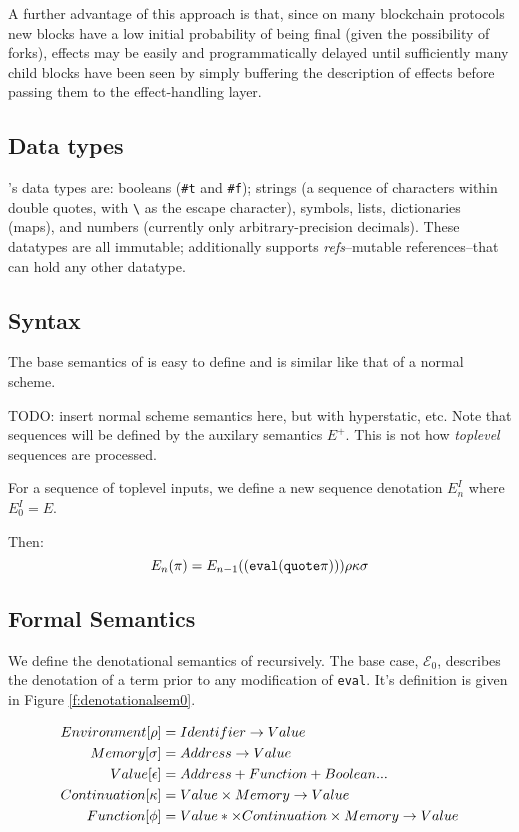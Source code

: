 A further advantage of this approach is that, since on many blockchain
protocols new blocks have a low initial probability of being final (given the
possibility of forks), effects may be easily and programmatically delayed until
sufficiently many child blocks have been seen by simply buffering the
description of effects before passing them to the effect-handling layer.

\subsection{Data types} \rad's data types are: booleans (\texttt{\#t} and
\texttt{\#f}); strings (a sequence of characters within double quotes, with
\texttt{\textbackslash} as the escape character), symbols, lists, dictionaries
(maps), and numbers (currently only arbitrary-precision decimals). These
datatypes are all immutable; additionally \rad supports \emph{refs}--mutable
references--that can hold any other datatype.

\subsection{Syntax}


The base semantics of \rad is easy to define and is similar like that of a normal
scheme.

TODO: insert normal scheme semantics here, but with hyperstatic, etc. Note that
sequences will be defined by the auxilary semantics $E^+$. This is
not how \emph{toplevel} sequences are processed.

For a sequence of toplevel inputs, we define a new sequence denotation
$E_n^I$ where $E_0^I = E$.

Then:
\[
E_n(\pi) = E_{n-1} (\mathtt{( eval (quote \pi))}) \rho\kappa\sigma
\]


\subsection{Formal Semantics} We define the denotational semantics of \rad
recursively. The base case, $\mathcal{E}_{0}$, describes the denotation of a
term prior to any modification of \texttt{eval}. It's definition is given in
Figure \ref{f:denotationalsem0}.

\begin{figure}[H]
\begin{align*}
    Environment [\rho] &= Identifier \rightarrow Value \\
    Memory [\sigma] &= Address \rightarrow Value \\
    Value [\epsilon] &= Address + Function + Boolean ... \\
    Continuation [\kappa] &= Value \times Memory \rightarrow Value \\
    Function [\phi] &= Value* \times Continuation \times Memory \rightarrow Value
\end{align*}
\label{f:denotationalsemleged}
\end{figure}


